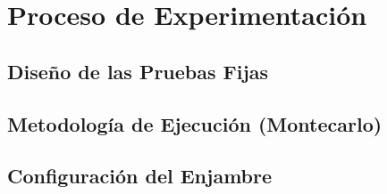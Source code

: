 \chapter{Proceso de Experimentación}

\section{Diseño de las Pruebas Fijas}

\section{Metodología de Ejecución (Montecarlo)}

\section{Configuración del Enjambre}
